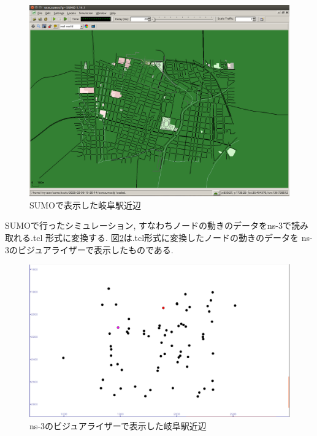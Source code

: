 \begin{figure}[h]
  \centering
  \includegraphics[scale=0.3]{figures/SUMO2.png}
  \caption{SUMOで表示した岐阜駅近辺}
  \label{fig:sumo2}
\end{figure}
\FloatBarrier
\indent SUMOで行ったシミュレーション, すなわちノードの動きのデータをns-3で読み
取れる.tcl 形式に変換する. 図\ref{fig:sumo3}は.tcl形式に変換したノードの動きのデータを
ns-3のビジュアライザーで表示したものである.
\begin{figure}[h]
  \centering
  \includegraphics[scale=0.3]{figures/SUMO3.png}
  \caption{ns-3のビジュアライザーで表示した岐阜駅近辺}
  \label{fig:sumo3}
\end{figure}
\FloatBarrier

